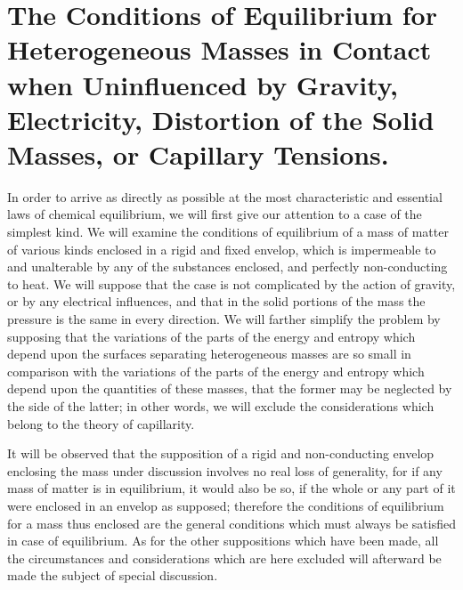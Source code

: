\documentclass[12pt]{article}
\begin{document}
\section{The Conditions of Equilibrium for Heterogeneous Masses in Contact when Uninfluenced by Gravity, Electricity, Distortion of the Solid Masses, or Capillary Tensions.}

In order to arrive as directly as possible at the most characteristic and essential laws of chemical equilibrium, we will first give our attention to a case of the simplest kind. We will examine the conditions of equilibrium of a mass of matter of various kinds enclosed in a rigid and fixed envelop, which is impermeable to and unalterable by any of the substances enclosed, and perfectly non-conducting to heat. We will suppose that the case is not complicated by the action of gravity, or by any electrical influences, and that in the solid portions of the mass the pressure is the same in every direction. We will farther simplify the problem by supposing that the variations of the parts of the energy and entropy which depend upon the surfaces separating heterogeneous masses are so small in comparison with the variations of the parts of the energy and entropy which depend upon the quantities of these masses, that the former may be neglected by the side of the latter; in other words, we will exclude the considerations which belong to the theory of capillarity.

It will be observed that the supposition of a rigid and non-conducting envelop enclosing the mass under discussion involves no real loss of generality, for if any mass of matter is in equilibrium, it would also be so, if the whole or any part of it were enclosed in an envelop as supposed; therefore the conditions of equilibrium for a mass thus enclosed are the general conditions which must always be satisfied in case of equilibrium. As for the other suppositions which have been made, all the circumstances and considerations which are here excluded will afterward be made the subject of special discussion.
\end{document}
